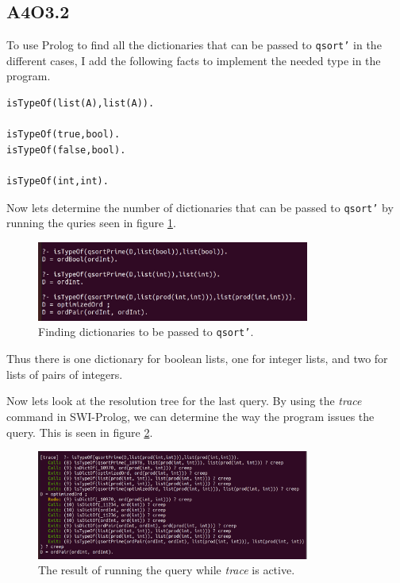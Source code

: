 \subsection*{A4O3.2}
To use Prolog to find all the dictionaries that can be passed to \texttt{qsort'} in the different cases, I add the following facts to implement the needed type in the program.

\begin{verbatim}
isTypeOf(list(A),list(A)).

isTypeOf(true,bool).
isTypeOf(false,bool).

isTypeOf(int,int).
\end{verbatim}

Now lets determine the number of dictionaries that can be passed to \texttt{qsort'} by running the quries seen in figure \ref{fig:dicts}.

\begin{figure}[h]
\centering
\includegraphics[width=0.8\textwidth]{O32.png}
\caption{Finding dictionaries to be passed to \texttt{qsort'}.}
\label{fig:dicts}
\end{figure}
\newpage
Thus there is one dictionary for boolean lists, one for integer lists, and two for lists of pairs of integers.

Now lets look at the resolution tree for the last query. By using the \textit{trace} command in SWI-Prolog, we can determine the way the program issues the query. This is seen in figure \ref{fig:resTrace}.

\begin{figure}[h]
\centering
\includegraphics[width=0.8\textwidth]{resTrace.png}
\caption{The result of running the query while \textit{trace} is active.}
\label{fig:resTrace}
\end{figure}

